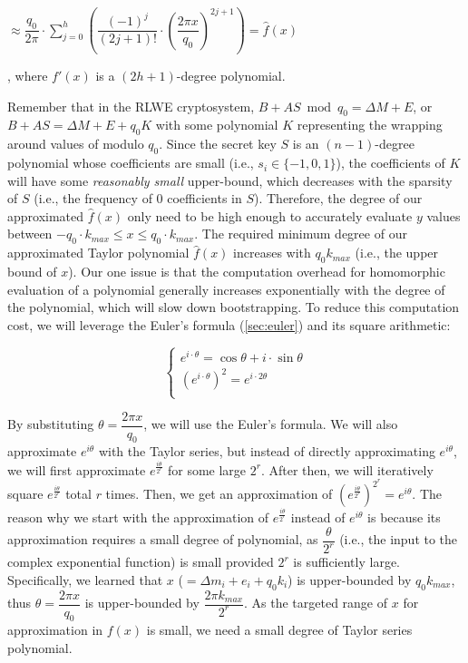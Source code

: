 $ \approx \dfrac{q_0}{2\pi}\cdot \sum\limits_{j=0}^{h}\left(\dfrac{(-1)^j}{(2j + 1)!}\cdot \left(\dfrac{2\pi x}{q_0}\right)^{2j + 1}\right) = \hat f(x)$

, where $f'(x)$ is a $(2h + 1)$-degree polynomial. 

Remember that in the RLWE cryptosystem, $B + AS \bmod q_0 = \Delta M + E$, or $B + AS = \Delta M + E + q_0K$ with some polynomial $K$ representing the wrapping around values of modulo $q_0$. Since the secret key $S$ is an $(n-1)$-degree polynomial whose coefficients are small (i.e., $s_i \in \{-1, 0, 1\}$), the coefficients of $K$ will have some \textit{reasonably small} upper-bound, which decreases with the sparsity of $S$ (i.e., the frequency of 0 coefficients in $S$). Therefore, the degree of our approximated $\hat f(x)$ only need to be high enough to accurately evaluate $y$ values between $-q_0\cdot \mathit{k_{max}} \leq x \leq q_0\cdot \mathit{k_{max}}$.
The required minimum degree of our approximated Taylor polynomial $\hat f(x)$ increases with $q_0\mathit{k_{max}}$ (i.e., the upper bound of $x$). Our one issue is that the computation overhead for homomorphic evaluation of a polynomial generally increases exponentially with the degree of the polynomial, which will slow down bootstrapping. To reduce this computation cost, we will leverage the Euler's formula (\autoref{sec:euler}) and its square arithmetic:

\[
\begin{cases}
e^{i\cdot \theta} = \cos \theta + i \cdot \sin \theta\\
(e^{i \cdot \theta})^2 = e^{i\cdot 2\theta}\\
\end{cases}
\]

By substituting $\theta = \dfrac{2\pi x}{q_0}$, we will use the Euler's formula. We will also approximate $e^{i\theta}$ with the Taylor series, but instead of directly approximating $e^{i\theta}$, we will first approximate $e^{\frac{i\theta}{2^r}}$ for some large $2^r$. After then, we will iteratively square $e^{\frac{i\theta}{2^r}}$ total $r$ times. Then, we get an approximation of $(e^{\frac{i\theta}{2^r}})^{2^r} = e^{i\theta}$. The reason why we start with the approximation of $e^{\frac{i\theta}{2^r}}$ instead of $e^{i\theta}$ is because its approximation requires a small degree of polynomial, as $\dfrac{\theta}{2^r}$ (i.e., the input to the complex exponential function) is small provided $2^r$ is sufficiently large. Specifically, we learned that $x$ ($= \Delta m_i + e_i + q_0k_i$) is upper-bounded by $q_0\mathit{k_{max}}$, thus $\theta = \dfrac{2\pi x}{q_0}$ is upper-bounded by $\dfrac{2\pi\mathit{k_{max}}}{2^r}$. As the targeted range of $x$ for approximation in $f(x)$ is small, we need a small degree of Taylor series polynomial. 

